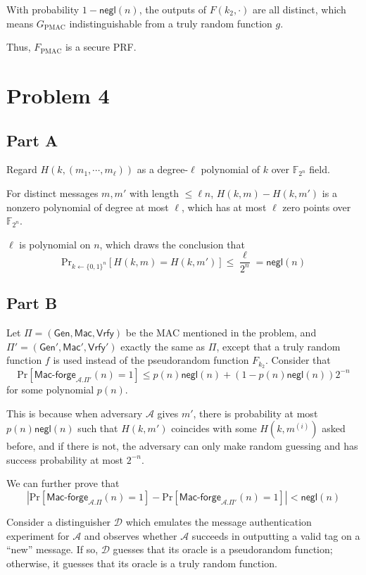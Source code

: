 \documentclass[8pt]{article}
\theoremstyle{compact}
\def\le{\leqslant}
\begin{document}
With probability $1 - \textsf{negl}(n)$, the outputs of $F(k_2, \cdot)$ are all distinct, which means $G_{\text{PMAC}}$ indistinguishable from a truly random function $g$.

Thus, $F_{\text{PMAC}}$ is a secure PRF.

\section*{Problem 4}

\subsection*{Part A}
Regard $H(k, (m_1, \cdots, m_{\ell}))$ as a degree-$\ell$ polynomial of $k$ over $\mathbb F_{2^n}$ field.

For distinct messages $m, m'$ with length $\le \ell n$, $H(k, m) - H(k, m')$ is a nonzero polynomial of degree at most $\ell$, which has at most $\ell$ zero points over $\mathbb F_{2^n}$.

$\ell$ is polynomial on $n$, which draws the conclusion that $$\text{Pr}_{k \gets \{0, 1\}^n} \left[H(k, m) = H(k, m')\right] \le \frac{\ell}{2^n} = \textsf{negl}(n)$$

\subsection*{Part B}
Let $\Pi = (\textsf{Gen}, \textsf{Mac}, \textsf{Vrfy})$ be the MAC mentioned in the problem, and $\Pi' = (\textsf{Gen}', \textsf{Mac}', \textsf{Vrfy}')$ exactly the same as $\Pi$, except that a truly random function $f$ is used instead of the pseudorandom function $F_{k_2}$. Consider that $$\text{Pr}\left[\textsf{Mac-forge}_{\mathcal A. \Pi'}(n) = 1\right] \le p(n)\textsf{negl}(n) + \left(1 - p(n)\textsf{negl}(n)\right)2^{-n}$$ for some polynomial $p(n)$.

This is because when adversary $\mathcal A$ gives $m'$, there is probability at most $p(n)\textsf{negl}(n)$ such that $H(k, m')$ coincides with some $H(k, m^{(i)})$ asked before, and if there is not, the adversary can only make random guessing and has success probability at most $2^{-n}$.

We can further prove that $$\left| \text{Pr}\left[\textsf{Mac-forge}_{\mathcal A. \Pi}(n) = 1\right] - \text{Pr}\left[\textsf{Mac-forge}_{\mathcal A. \Pi'}(n) = 1\right] \right| < \textsf{negl}(n)$$

Consider a distinguisher $\mathcal D$ which emulates the message authentication experiment for $\mathcal A$ and observes whether $\mathcal A$ succeeds in outputting a valid tag on a “new” message. If so, $\mathcal D$ guesses that its oracle is a pseudorandom function; otherwise, it guesses that its oracle is a truly random function.
\end{document}
